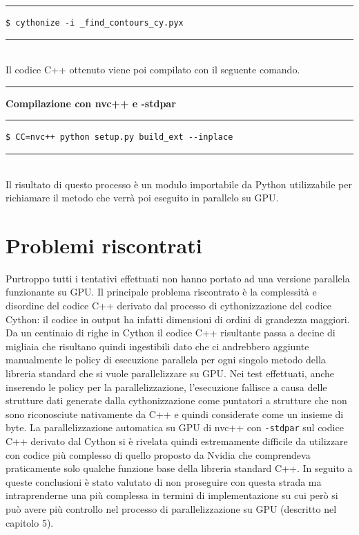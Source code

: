 \documentclass[12pt,a4paper]{report}
\begin{document}
\noindent\rule[0.5ex]{\linewidth}{1pt}
\begin{lstlisting}
$ cythonize -i _find_contours_cy.pyx
\end{lstlisting}
\noindent\rule[0.5ex]{\linewidth}{1pt} \\[8pt]
Il codice C++ ottenuto viene poi compilato con il seguente comando.\\[8pt]
\noindent\rule[0.5ex]{\linewidth}{2pt}
\small{\textbf{Compilazione con nvc++ e -stdpar}} \\
\noindent\rule[0.5ex]{\linewidth}{1pt}
\begin{lstlisting}
$ CC=nvc++ python setup.py build_ext --inplace
\end{lstlisting}
\noindent\rule[0.5ex]{\linewidth}{1pt} \\[10pt]
Il risultato di questo processo è un modulo importabile da Python utilizzabile per richiamare il metodo che verrà poi eseguito in parallelo su GPU. \newline 

\section{Problemi riscontrati}
Purtroppo tutti i tentativi effettuati non hanno portato ad una versione parallela funzionante su GPU. Il principale problema riscontrato è la complessità e disordine del codice C++ derivato dal processo di cythonizzazione del codice Cython: il codice in output ha infatti dimensioni di ordini di grandezza maggiori. Da un centinaio di righe in Cython il codice C++ risultante passa a decine di migliaia che risultano quindi ingestibili dato che ci andrebbero aggiunte manualmente le policy di esecuzione parallela per ogni singolo metodo della libreria standard che si vuole parallelizzare su GPU. Nei test effettuati, anche inserendo le policy per la parallelizzazione, l'esecuzione fallisce a causa delle strutture dati generate dalla cythonizzazione come puntatori a strutture che non sono riconosciute nativamente da C++ e quindi considerate come un insieme di byte. La parallelizzazione automatica su GPU di nvc++ con \verb|-stdpar| sul codice C++ derivato dal Cython si è rivelata quindi estremamente difficile da utilizzare con codice più complesso di quello proposto da Nvidia che comprendeva praticamente solo qualche funzione base della libreria standard C++. \newline
In seguito a queste conclusioni è stato valutato di non proseguire con questa strada ma intraprenderne una più complessa in termini di implementazione su cui però si può avere più controllo nel processo di parallelizzazione su GPU (descritto nel capitolo 5).
\end{document}
